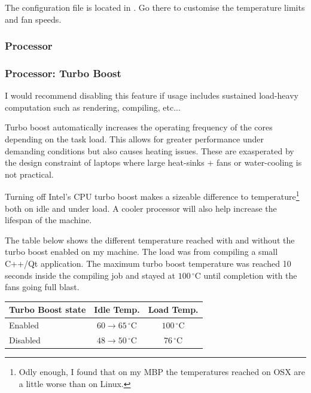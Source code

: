 
The configuration file is located in . Go there to customise the temperature limits and fan speeds.

\subsubsection{Processor}


\subsubsection{Processor: Turbo Boost}

I would recommend disabling this feature if usage includes sustained load-heavy computation such as rendering, compiling, etc...

Turbo boost automatically increases the operating frequency of the cores depending on the task load. This allows for greater performance under demanding conditions but also causes heating issues. These are exasperated by the design constraint of laptops where large heat-sinks + fans or water-cooling is not practical.

Turning off Intel's CPU turbo boost makes a sizeable difference to temperature\footnote{Odly enough, I found that on my MBP the temperatures reached on OSX are a little worse than on Linux.} both on idle and under load. A cooler processor will also help increase the lifespan of the machine.

The table below shows the different temperature reached with and without the turbo boost enabled on my machine. The load was from compiling a small C++/Qt application.
The maximum turbo boost temperature was reached 10 seconds inside the compiling job and stayed at $100\,^{\circ}\mathrm{C}$ until completion with the fans going full blast.

\begin{center}
	\vspace*{1em}
	\setlength\arrayrulewidth{1pt}
	\begin{tabular}{|l|c|c|}
		\rowcolor{white!50}
		\hline
		\textbf{Turbo Boost state} & \textbf{Idle Temp.} & \textbf{Load Temp.}\\
		\hline\hline
		Enabled & $60\to 65\,^{\circ}\mathrm{C}$ & $100\,^{\circ}\mathrm{C}$\\ 
		Disabled &  $48\to 50\,^{\circ}\mathrm{C}$ & $76\,^{\circ}\mathrm{C}$\\
		\hline
	\end{tabular}
	\vspace*{1em}
\end{center}

